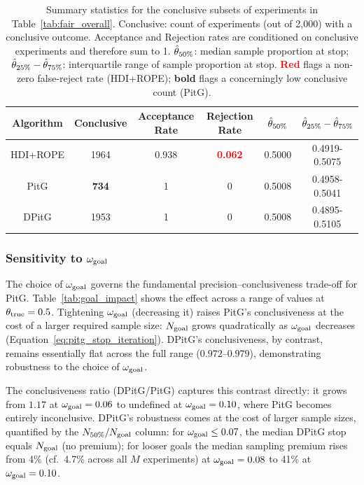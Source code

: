 \begin{table}[h!]
  \begin{center}
  \begin{tabular}{c|c|c|c|c|c}
    \hline
    Algorithm & Conclusive & Acceptance Rate & Rejection Rate &  $\hat{\theta}_{\rm 50\%}$ & $\hat{\theta}_{\rm 25\%} - \hat{\theta}_{\rm 75\%}$\\
    \hline
    HDI+ROPE & 1964 & 0.938 & \textcolor{red}{\textbf{0.062}} & 0.5000 & 0.4919-0.5075 \\
    PitG     &  \textbf{734} & 1     & 0     & 0.5008 & 0.4958-0.5041 \\
    DPitG    & 1953 & 1     & 0     & 0.5008 & 0.4895-0.5105\\
    \hline
  \end{tabular}
  \caption{Summary statistics for the conclusive subsets of experiments in
  Table~\ref{tab:fair_overall}.
  Conclusive: count of experiments (out of 2{,}000) with a conclusive outcome.
  Acceptance and Rejection rates are conditioned on conclusive experiments
  and therefore sum to 1.
  $\hat{\theta}_{\rm 50\%}$: median sample proportion at stop;
  $\hat{\theta}_{\rm 25\%} - \hat{\theta}_{\rm 75\%}$: interquartile range of
  sample proportion at stop.
  \textcolor{red}{\textbf{Red}} flags a non-zero false-reject rate (HDI+ROPE); \textbf{bold} flags a concerningly low conclusive count (PitG).}
  \label{tab:fair_conclusive}
\end{center}
\end{table}

\subsubsection{Sensitivity to $\omega_{\rm goal}$}\label{sec:goal_impact}

The choice of $\omega_{\rm goal}$ governs the fundamental precision--conclusiveness
trade-off for PitG. Table~\ref{tab:goal_impact} shows the effect across a range of values
at $\theta_{\rm true}=0.5$. Tightening $\omega_{\rm goal}$ (decreasing it) raises PitG's
conclusiveness at the cost of a larger required sample size: $N_{\rm goal}$ grows
quadratically as $\omega_{\rm goal}$ decreases (Equation~\ref{eq:pitg_stop_iteration}).
DPitG's conclusiveness, by contrast, remains essentially flat across the full range
($0.972$--$0.979$), demonstrating robustness to the choice of $\omega_{\rm goal}$.

The conclusiveness ratio (DPitG/PitG) captures this contrast directly: it grows from
$1.17$ at $\omega_{\rm goal}=0.06$ to undefined at $\omega_{\rm goal}=0.10$, where PitG
becomes entirely inconclusive. DPitG's robustness comes at the cost of larger sample
sizes, quantified by the $N_{\rm 50\%}/N_{\rm goal}$ column: for $\omega_{\rm goal} \le 0.07$,
the median DPitG stop equals $N_{\rm goal}$ (no premium); for looser goals the median
sampling premium rises from 4\% (cf.\ 4.7\% across all $M$ experiments) at
$\omega_{\rm goal}=0.08$ to 41\% at $\omega_{\rm goal}=0.10$.


